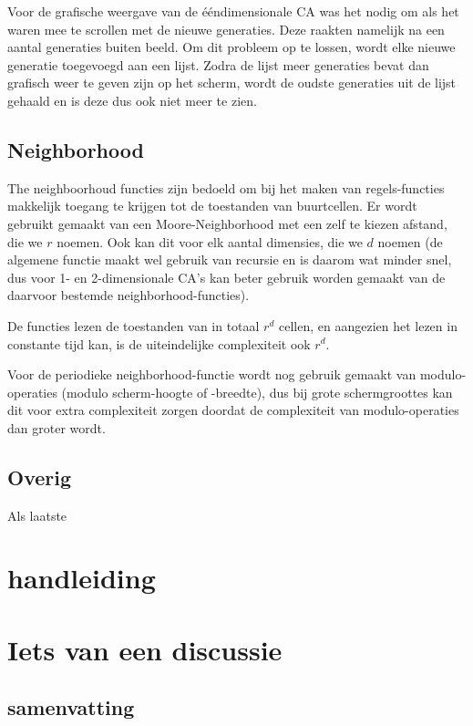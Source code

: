 \documentclass{article}
\begin{document}
Voor de grafische weergave van de ééndimensionale CA was het nodig om als het waren mee te scrollen met de nieuwe generaties. Deze raakten namelijk na een aantal generaties buiten beeld. Om dit probleem op te lossen, wordt elke nieuwe generatie toegevoegd aan een lijst. Zodra de lijst meer generaties bevat dan grafisch weer te geven zijn op het scherm, wordt de oudste generaties uit de lijst gehaald en is deze dus ook niet meer te zien.

\subsection{Neighborhood}
The neighboorhoud functies zijn bedoeld om bij het maken van regels-functies makkelijk toegang te krijgen tot de toestanden van buurtcellen. Er wordt gebruikt gemaakt van een Moore-Neighborhood met een zelf te kiezen afstand, die we $r$ noemen. Ook kan dit voor elk aantal dimensies, die we $d$ noemen (de algemene functie maakt wel gebruik van recursie en is daarom wat minder snel, dus voor 1- en 2-dimensionale CA's kan beter gebruik worden gemaakt van de daarvoor bestemde neighborhood-functies). 

De functies lezen de toestanden van in totaal $r^d$ cellen, en aangezien het lezen in constante tijd kan, is de uiteindelijke complexiteit ook $r^d$.

Voor de periodieke neighborhood-functie wordt nog gebruik gemaakt van modulo-operaties (modulo scherm-hoogte of -breedte), dus bij grote schermgroottes kan dit voor extra complexiteit zorgen doordat de complexiteit van modulo-operaties dan groter wordt. 

\subsection{Overig}
Als laatste 

\section{handleiding}

\section{Iets van een discussie}

\subsection{samenvatting}
\end{document}
